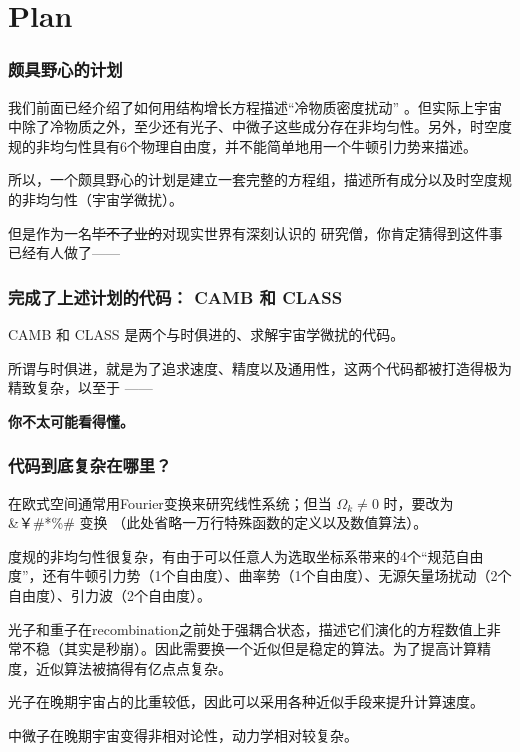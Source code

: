 \documentclass[CJK,13pt]{beamer}
\date{}
\begin{document}
  \bch

  \section{Plan}

  
  \begin{frame}

    \frametitle{颇具野心的计划}
    我们前面已经介绍了如何用结构增长方程描述“冷物质密度扰动” 。但实际上宇宙中除了冷物质之外，至少还有光子、中微子这些成分存在非均匀性。另外，时空度规的非均匀性具有6个物理自由度，并不能简单地用一个牛顿引力势来描述。


    \skipline

    所以，一个颇具野心的计划是建立一套完整的方程组，描述所有成分以及时空度规的非均匀性（宇宙学微扰）。

    \skipline
    
    但是作为一名\sout{毕不了业的}对现实世界有深刻认识的 研究僧，你肯定猜得到这件事已经有人做了——
  \end{frame}

  \begin{frame}
    \frametitle{完成了上述计划的代码： CAMB 和 CLASS}
    CAMB 和 CLASS 是两个与时俱进的、求解宇宙学微扰的代码。

    \skipline

    所谓与时俱进，就是为了追求速度、精度以及通用性，这两个代码都被打造得极为精致复杂，以至于 ——


    {\bf\large 你不太可能看得懂。}
  \end{frame}


  \begin{frame}
    \frametitle{代码到底复杂在哪里？}
    \bitem
  \item{在欧式空间通常用Fourier变换来研究线性系统；但当 $\Omega_k\ne 0$ 时，要改为 \&￥\#*\%\# 变换 （此处省略一万行特殊函数的定义以及数值算法）。}
  \item{度规的非均匀性很复杂，有由于可以任意人为选取坐标系带来的4个“规范自由度”，还有牛顿引力势（1个自由度）、曲率势（1个自由度）、无源矢量场扰动（2个自由度）、引力波（2个自由度）。}
  \item{光子和重子在recombination之前处于强耦合状态，描述它们演化的方程数值上非常不稳（其实是秒崩）。因此需要换一个近似但是稳定的算法。为了提高计算精度，近似算法被搞得有亿点点复杂。}    
  \item{光子在晚期宇宙占的比重较低，因此可以采用各种近似手段来提升计算速度。}
  \item{中微子在晚期宇宙变得非相对论性，动力学相对较复杂。}
    \eitem
  \end{frame}
\end{document}
